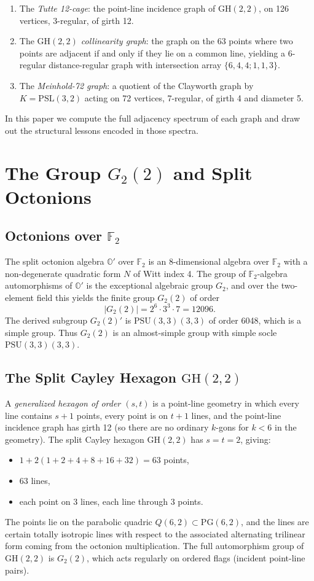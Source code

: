 \documentclass[11pt,a4paper]{article}
\theoremstyle{plain}
\theoremstyle{definition}
\theoremstyle{remark}
\newcommand{\GH}{\mathrm{GH}(2,2)}
\newcommand{\PSU}{\mathrm{PSU}(3,3)}
\newcommand{\PSL}{\mathrm{PSL}}
\begin{document}
\begin{enumerate}
  \item The \emph{Tutte 12-cage}: the point-line incidence graph of $\GH$, on 126 vertices,
        3-regular, of girth 12.
  \item The \emph{$\GH$ collinearity graph}: the graph on the 63 points where two points
        are adjacent if and only if they lie on a common line, yielding a 6-regular
        distance-regular graph with intersection array $\{6,4,4;1,1,3\}$.
  \item The \emph{Meinhold-72 graph}: a quotient of the Clayworth graph by $K = \PSL(3,2)$
        acting on 72 vertices, 7-regular, of girth 4 and diameter 5.
\end{enumerate}

In this paper we compute the full adjacency spectrum of each graph and draw out the
structural lessons encoded in those spectra.

\section{The Group $G_2(2)$ and Split Octonions}

\subsection{Octonions over $\mathbb{F}_2$}

The split octonion algebra $\mathbb{O}'$ over $\mathbb{F}_2$ is an 8-dimensional algebra
over $\mathbb{F}_2$ with a non-degenerate quadratic form $N$ of Witt index 4.  The group
of $\mathbb{F}_2$-algebra automorphisms of $\mathbb{O}'$ is the exceptional algebraic group
$G_2$, and over the two-element field this yields the finite group $G_2(2)$ of order
\[
  |G_2(2)| = 2^6 \cdot 3^3 \cdot 7 = 12096.
\]
The derived subgroup $G_2(2)'$ is $\PSU(3,3)$ of order 6048, which is a simple group.
Thus $G_2(2)$ is an almost-simple group with simple socle $\PSU(3,3)$.

\subsection{The Split Cayley Hexagon $\GH$}

A \emph{generalized hexagon of order $(s,t)$} is a point-line geometry in which every
line contains $s+1$ points, every point is on $t+1$ lines, and the point-line incidence
graph has girth 12 (so there are no ordinary $k$-gons for $k < 6$ in the geometry).
The split Cayley hexagon $\GH$ has $s = t = 2$, giving:
\begin{itemize}[noitemsep]
  \item $1 + 2(1 + 2 + 4 + 8 + 16 + 32) = 63$ points,
  \item $63$ lines,
  \item each point on 3 lines, each line through 3 points.
\end{itemize}
The points lie on the parabolic quadric $Q(6,2) \subset \mathrm{PG}(6,2)$, and the lines
are certain totally isotropic lines with respect to the associated alternating trilinear
form coming from the octonion multiplication.  The full automorphism group of $\GH$
is $G_2(2)$, which acts regularly on ordered flags (incident point-line pairs).
\end{document}
